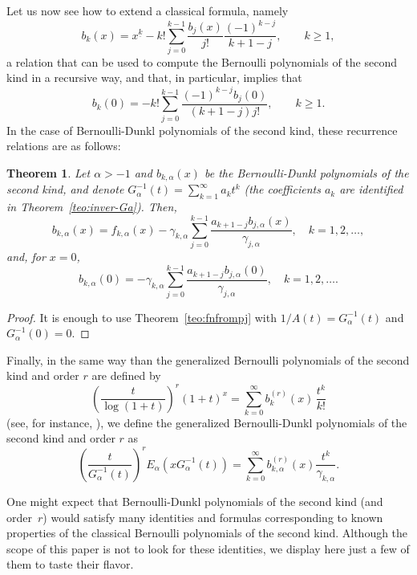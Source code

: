 \documentclass[11pt]{article}
\theoremstyle{plain}
\newtheorem{theorem}{Theorem}[section]
\theoremstyle{remark}
\numberwithin{equation}{section} %
\newcommand{\Ea}{E_{\alpha}}
\newcommand{\cc}{\gamma}
\begin{document}
Let us now see how to extend a classical formula, namely
\[
  b_k(x) = x^{\underline{k}} - k! \sum_{j=0}^{k-1} \frac{b_j(x)}{j!} \frac{(-1)^{k-j}}{k+1-j},
  \qquad k \ge 1,
\]
a relation that can be used to compute the Bernoulli polynomials of the second kind in a recursive way,
and that, in particular, implies that
\[
  b_k(0) = - k! \sum_{j=0}^{k-1} \frac{(-1)^{k-j}b_j(0)}{(k+1-j)j!},
  \qquad k \ge 1.
\]
In the case of Bernoulli-Dunkl polynomials of the second kind, these recurrence relations are as follows:

\begin{theorem}
Let $\alpha>-1$ and $b_{k,\alpha}(x)$ be the Bernoulli-Dunkl polynomials of the second kind,
and denote $G_\alpha^{-1}(t) = \sum_{k=1}^{\infty} a_k t^k$ (the coefficients $a_k$ are identified in Theorem~\ref{teo:inver-Ga}).
Then, 
\begin{equation*}
b_{k,\alpha}(x) = f_{k,\alpha}(x) - \cc_{k,\alpha} \sum_{j=0}^{k-1} 
\frac{a_{k+1-j} b_{j,\alpha}(x)}{\cc_{j,\alpha}},
\quad k=1,2,\ldots,
\end{equation*}
and, for $x=0$,
\begin{equation*}
b_{k,\alpha}(0) = -\cc_{k,\alpha} \sum_{j=0}^{k-1} \frac{a_{k+1-j} b_{j,\alpha}(0)}{\cc_{j,\alpha}},
\quad k=1,2,\ldots.
\end{equation*}
\end{theorem}

\begin{proof}
It is enough to use Theorem~\ref{teo:fnfrompj} with $1/A(t) = G_\alpha^{-1}(t)$ and $G_\alpha^{-1}(0)=0$.
\end{proof}

Finally, in the same way than the generalized Bernoulli polynomials of the second kind and order $r$ are defined by
\begin{equation*}
  \left(\frac{t}{\log(1+t)}\right)^r (1+t)^x 
  = \sum_{k=0}^\infty b_k^{(r)}(x) \, \frac{t^k}{k!}
\end{equation*}
(see, for instance, \cite[\S\,2]{Car}), we define the generalized Bernoulli-Dunkl polynomials of the second kind and order $r$ as
\begin{equation}
\label{eq:bkar}
  \left(\frac{t}{G_{\alpha}^{-1}(t)}\right)^r \Ea(x G_{\alpha}^{-1}(t)) 
  = \sum_{k=0}^{\infty} b_{k,\alpha}^{(r)}(x) \frac{t^k}{\cc_{k,\alpha}}.
\end{equation}

One might expect that Bernoulli-Dunkl polynomials of the second kind 
(and order~$r$) would satisfy many identities and formulas corresponding to known 
properties of the classical Bernoulli polynomials of the second kind. 
Although the scope of this paper is not to look for these identities, 
we display here just a few of them to taste their flavor.
\end{document}

